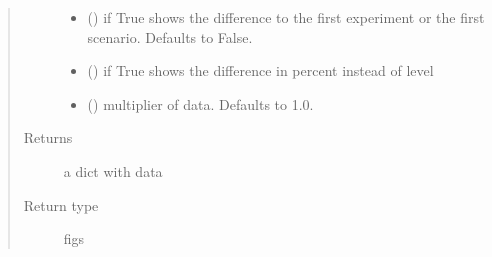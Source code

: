 \documentclass[letterpaper,10pt,english]{sphinxmanual}
\begin{document}
\begin{fulllineitems}
\begin{fulllineitems}
\begin{quote}
\begin{description}
\begin{itemize}
\item {} 
\sphinxAtStartPar
{} (\sphinxstyleliteralemphasis{\sphinxupquote{, }}) \textendash{} if True shows the difference to the
first experiment or the first scenario. Defaults to False.

\item {} 
\sphinxAtStartPar
{} (\sphinxstyleliteralemphasis{\sphinxupquote{,}}) \textendash{} if True shows the difference in percent instead of level

\item {} 
\sphinxAtStartPar
{} (\sphinxstyleliteralemphasis{\sphinxupquote{, }}) \textendash{} multiplier of data. Defaults to 1.0.

\end{itemize}

\item[{Returns}] \leavevmode
\sphinxAtStartPar
a dict with data

\item[{Return type}] \leavevmode
\sphinxAtStartPar
figs

\end{description}\end{quote}

\end{fulllineitems}



\end{fulllineitems}
\end{document}
